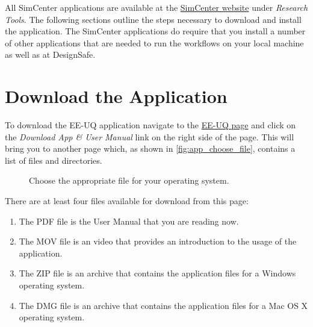 All SimCenter applications are available at the \href{https://simcenter.designsafe-ci.org/research-tools/overview/}{SimCenter website} under \emph{Research Tools}. The following sections outline the steps necessary to download and install the application. The SimCenter applications do require that you install a number of other applications that are needed to run the workflows on your local machine as well as at DesignSafe. \\


\section{Download the Application}


To download the EE-UQ application navigate to the \href{https://simcenter.designsafe-ci.org/research-tools/ee-uq-application/}{EE-UQ page} and click on the \emph{Download App \& User Manual} link on the right side of the page. This will bring you to another page which, as shown in \autoref{fig:app_choose_file},  contains a list of files and directories. 


\begin{figure}[!htbp]
  \caption{Choose the appropriate file for your operating system.}
  \label{fig:app_choose_file}
\end{figure}

There are at least four files available for download from this page: 
\begin{enumerate}
    \item The PDF file is the User Manual that you are reading now.
    \item The MOV file is an video that provides an introduction to the usage of the application.
    \item The ZIP file is an archive that contains the application files for a Windows operating system.
    \item The DMG file is an archive that contains the application files for a Mac OS X operating system.
\end{enumerate}


